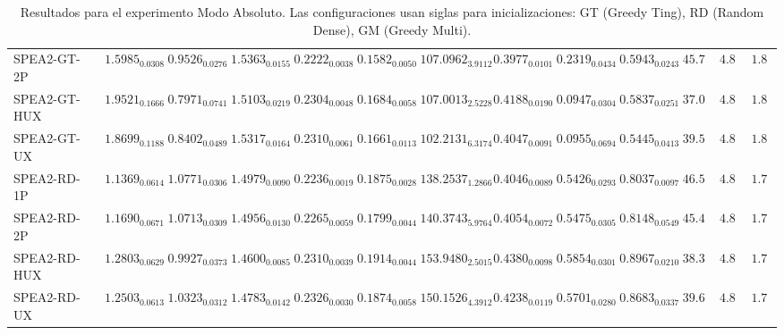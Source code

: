 \documentclass[11pt,a4paper]{article}
\begin{document}
\begin{table}[H]
{\begin{tabular}{lcccccccccccc}
SPEA2-GT-2P & $1.5985_{0.0308}$ & $0.9526_{0.0276}$ & $1.5363_{0.0155}$ & $0.2222_{0.0038}$ & $0.1582_{0.0050}$ & $107.0962_{3.9112}$ & $0.3977_{0.0101}$ & $0.2319_{0.0434}$ & $0.5943_{0.0243}$ & $45.78$ & $4.89$ & $1.89$ \\
SPEA2-GT-HUX & $1.9521_{0.1666}$ & $0.7971_{0.0741}$ & $1.5103_{0.0219}$ & $0.2304_{0.0048}$ & $0.1684_{0.0058}$ & $107.0013_{2.5228}$ & $0.4188_{0.0190}$ & $0.0947_{0.0304}$ & $0.5837_{0.0251}$ & $37.00$ & $4.89$ & $1.89$ \\
SPEA2-GT-UX & $1.8699_{0.1188}$ & $0.8402_{0.0489}$ & $1.5317_{0.0164}$ & $0.2310_{0.0061}$ & $0.1661_{0.0113}$ & $102.2131_{6.3174}$ & $0.4047_{0.0091}$ & $0.0955_{0.0694}$ & $0.5445_{0.0413}$ & $39.56$ & $4.89$ & $1.89$ \\
SPEA2-RD-1P & $1.1369_{0.0614}$ & $1.0771_{0.0306}$ & $1.4979_{0.0090}$ & $0.2236_{0.0019}$ & $0.1875_{0.0028}$ & $138.2537_{1.2866}$ & $0.4046_{0.0089}$ & $0.5426_{0.0293}$ & $0.8037_{0.0097}$ & $46.56$ & $4.89$ & $\mathbf{1.78}$ \\
SPEA2-RD-2P & $1.1690_{0.0671}$ & $1.0713_{0.0309}$ & $1.4956_{0.0130}$ & $0.2265_{0.0059}$ & $0.1799_{0.0044}$ & $140.3743_{5.9764}$ & $0.4054_{0.0072}$ & $0.5475_{0.0305}$ & $0.8148_{0.0549}$ & $45.44$ & $4.89$ & $\mathbf{1.78}$ \\
SPEA2-RD-HUX & $1.2803_{0.0629}$ & $0.9927_{0.0373}$ & $1.4600_{0.0085}$ & $0.2310_{0.0039}$ & $0.1914_{0.0044}$ & $\mathbf{153.9480}_{2.5015}$ & $0.4380_{0.0098}$ & $0.5854_{0.0301}$ & $0.8967_{0.0210}$ & $38.33$ & $4.89$ & $\mathbf{1.78}$ \\
SPEA2-RD-UX & $1.2503_{0.0613}$ & $1.0323_{0.0312}$ & $1.4783_{0.0142}$ & $0.2326_{0.0030}$ & $0.1874_{0.0058}$ & $\mathbf{150.1526}_{4.3912}$ & $0.4238_{0.0119}$ & $0.5701_{0.0280}$ & $0.8683_{0.0337}$ & $39.67$ & $4.89$ & $\mathbf{1.78}$ \\
\end{tabular}
}
\caption{Resultados para el experimento Modo Absoluto. Las configuraciones usan siglas para inicializaciones: GT (Greedy Ting), RD (Random Dense), GM (Greedy Multi).}
\label{tab:exp_Modo Absoluto}
\end{table}

\vspace{1cm}
\end{document}
